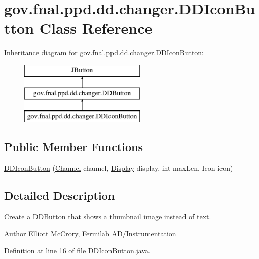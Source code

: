 \hypertarget{classgov_1_1fnal_1_1ppd_1_1dd_1_1changer_1_1DDIconButton}{\section{gov.\-fnal.\-ppd.\-dd.\-changer.\-D\-D\-Icon\-Button Class Reference}
\label{classgov_1_1fnal_1_1ppd_1_1dd_1_1changer_1_1DDIconButton}
}
Inheritance diagram for gov.\-fnal.\-ppd.\-dd.\-changer.\-D\-D\-Icon\-Button\-:\begin{figure}[H]
\begin{center}
\leavevmode
\includegraphics[height=3.000000cm]{classgov_1_1fnal_1_1ppd_1_1dd_1_1changer_1_1DDIconButton}
\end{center}
\end{figure}
\subsection*{Public Member Functions}
\begin{DoxyCompactItemize}
\item 
\hyperlink{classgov_1_1fnal_1_1ppd_1_1dd_1_1changer_1_1DDIconButton_a3ce3ff53b260e4cbbc984438c6b6d76a}{D\-D\-Icon\-Button} (\hyperlink{interfacegov_1_1fnal_1_1ppd_1_1dd_1_1signage_1_1Channel}{Channel} channel, \hyperlink{interfacegov_1_1fnal_1_1ppd_1_1dd_1_1signage_1_1Display}{Display} display, int max\-Len, Icon icon)
\end{DoxyCompactItemize}


\subsection{Detailed Description}
Create a \hyperlink{classgov_1_1fnal_1_1ppd_1_1dd_1_1changer_1_1DDButton}{D\-D\-Button} that shows a thumbnail image instead of text.

\begin{DoxyAuthor}{Author}
Elliott Mc\-Crory, Fermilab A\-D/\-Instrumentation 
\end{DoxyAuthor}


Definition at line 16 of file D\-D\-Icon\-Button.\-java.



